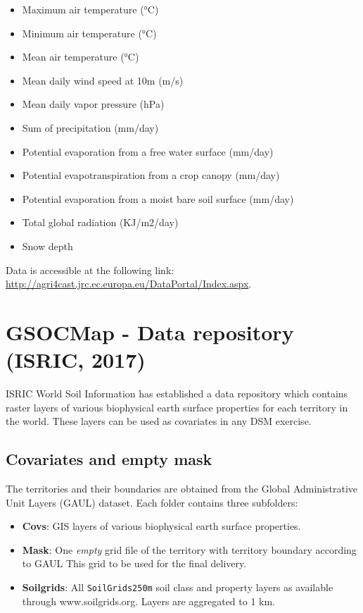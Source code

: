 \documentclass[10pt,b5paper,]{book}
\providecommand{\tightlist}{%
  \setlength{\itemsep}{0pt}\setlength{\parskip}{0pt}}
\theoremstyle{definition}
\theoremstyle{definition}
\theoremstyle{definition}
\theoremstyle{remark}
\begin{document}
\begin{itemize}
\tightlist
\item
  Maximum air temperature (°C)
\item
  Minimum air temperature (°C)
\item
  Mean air temperature (°C)
\item
  Mean daily wind speed at 10m (m/s)
\item
  Mean daily vapor pressure (hPa)
\item
  Sum of precipitation (mm/day)
\item
  Potential evaporation from a free water surface (mm/day)
\item
  Potential evapotranspiration from a crop canopy (mm/day)
\item
  Potential evaporation from a moist bare soil surface (mm/day)
\item
  Total global radiation (KJ/m2/day)
\item
  Snow depth
\end{itemize}

Data is accessible at the following link:
\url{http://agri4cast.jrc.ec.europa.eu/DataPortal/Index.aspx}.

\hypertarget{GSOCDataRepo}{%
\section{GSOCMap - Data repository (ISRIC, 2017)}\label{GSOCDataRepo}}

ISRIC World Soil Information has established a data repository which
contains raster layers of various biophysical earth surface properties
for each territory in the world. These layers can be used as covariates
in any DSM exercise.

\hypertarget{covariates-and-empty-mask}{%
\subsection{Covariates and empty mask}\label{covariates-and-empty-mask}}

The territories and their boundaries are obtained from the Global
Administrative Unit Layers (GAUL) dataset. Each folder contains three
subfolders:

\begin{itemize}
\tightlist
\item
  \textbf{Covs}: GIS layers of various biophysical earth surface
  properties.
\item
  \textbf{Mask}: One \emph{empty} grid file of the territory with
  territory boundary according to GAUL This grid to be used for the
  final delivery.
\item
  \textbf{Soilgrids}: All \texttt{SoilGrids250m} soil class and property
  layers as available through www.soilgrids.org. Layers are aggregated
  to 1 km.
\end{itemize}
\end{document}
